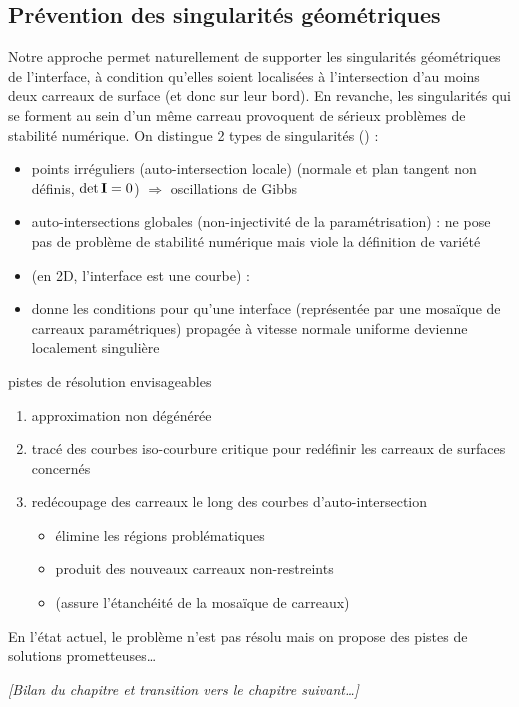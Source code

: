 \subsection{Prévention des singularités géométriques}
Notre approche permet naturellement de supporter les singularités géométriques de l'interface, à condition qu'elles soient localisées à l'intersection d'au moins deux carreaux de surface (et donc sur leur bord).
En revanche, les singularités qui se forment au sein d'un même carreau provoquent de sérieux problèmes de stabilité numérique.
On distingue 2 types de singularités (\cite[p.320]{patrikalakis2009}) :
\begin{itemize}
	\item points irréguliers (auto-intersection locale) (normale et plan tangent non définis, $\det{\mathbf{I}} = 0$) $\Rightarrow$ oscillations de Gibbs
	\item auto-intersections globales (non-injectivité de la paramétrisation) : ne pose pas de problème de stabilité numérique mais viole la définition de variété
\end{itemize}

\begin{itemize}
	\item \cite{jiao2001} (en 2D, \ie l'interface est une courbe) : 
	\item \cite{farouki1986} donne les conditions pour qu'une interface (représentée par une mosaïque de carreaux paramétriques) propagée à vitesse normale uniforme devienne localement singulière
\end{itemize}

pistes de résolution envisageables
\begin{enumerate}
	\item approximation non dégénérée \cite{farouki1986}
	\item tracé des courbes iso-courbure critique \cite[chap.8]{patrikalakis2009} pour redéfinir les carreaux de surfaces concernés
	\item redécoupage des carreaux le long des courbes d'auto-intersection \cite{urick2019} \label{item:découpage_carreau_singulier}
	\begin{itemize}
		\item élimine les régions problématiques
		\item produit des nouveaux carreaux non-restreints
		\item (assure l'étanchéité de la mosaïque de carreaux)
	\end{itemize}
	
\end{enumerate}

En l'état actuel, le problème n'est pas résolu mais on propose des pistes de solutions prometteuses\ldots

\par\bigskip
\textit{
	[Bilan du chapitre et transition vers le chapitre suivant\ldots]
}
